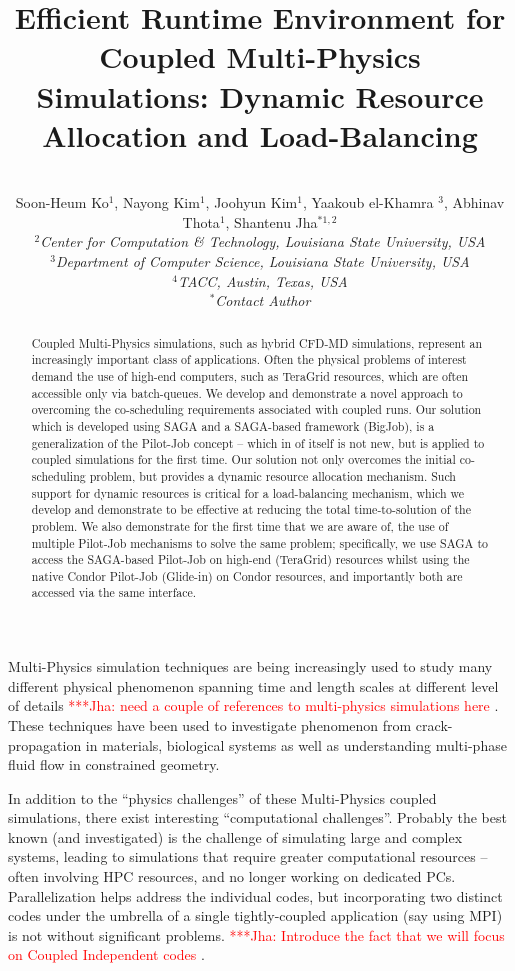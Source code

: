 \documentclass[conference,final]{IEEEtran}
\title{Efficient Runtime Environment for Coupled Multi-Physics Simulations: Dynamic Resource Allocation and Load-Balancing}
\author{
  ~\\[-2em]
  Soon-Heum Ko$^{1}$, Nayong Kim$^{1}$, Joohyun Kim$^{1}$, Yaakoub el-Khamra $^{3}$, Abhinav Thota$^{1}$, Shantenu Jha$^{*1,2}$\\
  \small{\emph{$^{2}$Center for Computation \& Technology, Louisiana State University, USA}}\\
  \small{\emph{$^{3}$Department of Computer Science, Louisiana State University, USA}}\\
  \small{\emph{$^{4}$TACC, Austin, Texas, USA}}\\
  \small{\emph{$^{*}$Contact Author}}\\
}
\newcommand{\jhanote}[1]{ {\textcolor{red} { ***Jha: #1 }}}
\newcommand{\jhanote}[1]{}
\begin{document}
\maketitle

\begin{abstract}
  Coupled Multi-Physics simulations, such as hybrid CFD-MD simulations, represent an increasingly important class of applications.  Often the physical problems of interest demand the use of high-end computers, such as TeraGrid resources, which are often accessible only via batch-queues.  We develop and demonstrate a novel approach to overcoming the co-scheduling requirements associated with coupled runs.  Our solution which is developed using SAGA and a SAGA-based framework (BigJob), is a generalization of the Pilot-Job concept -- which in of itself is not new, but is applied to coupled simulations for the first time.  Our solution not only overcomes the initial co-scheduling problem, but provides a dynamic resource allocation mechanism. Such support for dynamic resources is critical for a load-balancing mechanism, which we develop and demonstrate to be effective at reducing the total time-to-solution of the problem.  We also demonstrate for the first time that we are aware of, the use of multiple Pilot-Job mechanisms to solve the same problem; specifically, we use SAGA to access the SAGA-based Pilot-Job on high-end (TeraGrid) resources whilst using the native Condor Pilot-Job (Glide-in) on Condor resources, and importantly both are accessed via the same interface. 
\end{abstract}



Multi-Physics simulation techniques are being increasingly used to study many different physical phenomenon spanning time and length scales at different level of details\jhanote{need a couple of references to multi-physics simulations here}. These techniques have been used to investigate phenomenon from crack-propagation in materials, biological systems as well as understanding multi-phase fluid flow in constrained geometry.

In addition to the ``physics challenges'' of these Multi-Physics coupled simulations, there exist interesting ``computational challenges''.  Probably the best known (and investigated) is the challenge of simulating large and complex systems, leading to simulations that require greater computational resources -- often involving HPC resources, and no longer working on dedicated PCs. Parallelization helps address the individual codes, but incorporating two distinct codes under the umbrella of a single tightly-coupled application (say using MPI) is not without significant problems.  \jhanote{Introduce the fact that we will focus on Coupled Independent codes}. 
\end{document}
